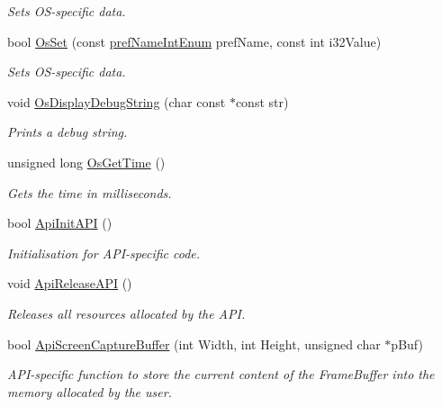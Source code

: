 \begin{DoxyCompactItemize}
\begin{DoxyCompactList}\small\item\em Sets O\+S-\/specific data. \end{DoxyCompactList}\item 
bool \hyperlink{class_p_v_r_shell_init_a106e2a1a5f4e45e93d982eea7466d322}{Os\+Set} (const \hyperlink{_p_v_r_shell_8h_a78ec4653192043575302f1448ae7054e}{pref\+Name\+Int\+Enum} pref\+Name, const int i32\+Value)
\begin{DoxyCompactList}\small\item\em Sets O\+S-\/specific data. \end{DoxyCompactList}\item 
void \hyperlink{class_p_v_r_shell_init_a282b715e1974b501cb178c140c546387}{Os\+Display\+Debug\+String} (char const $\ast$const str)
\begin{DoxyCompactList}\small\item\em Prints a debug string. \end{DoxyCompactList}\item 
unsigned long \hyperlink{class_p_v_r_shell_init_a4ee93258ea32e0656c002d2f788c94e8}{Os\+Get\+Time} ()
\begin{DoxyCompactList}\small\item\em Gets the time in milliseconds. \end{DoxyCompactList}\item 
bool \hyperlink{class_p_v_r_shell_init_af7302a4e9bdedf42303b351c2cc45f63}{Api\+Init\+A\+P\+I} ()
\begin{DoxyCompactList}\small\item\em Initialisation for A\+P\+I-\/specific code. \end{DoxyCompactList}\item 
void \hyperlink{class_p_v_r_shell_init_ac2854c9f2bc4ed75cc8b64c6ed64381b}{Api\+Release\+A\+P\+I} ()
\begin{DoxyCompactList}\small\item\em Releases all resources allocated by the A\+P\+I. \end{DoxyCompactList}\item 
bool \hyperlink{class_p_v_r_shell_init_a39a0e0003716ecb0d53401ba79a775ff}{Api\+Screen\+Capture\+Buffer} (int Width, int Height, unsigned char $\ast$p\+Buf)
\begin{DoxyCompactList}\small\item\em A\+P\+I-\/specific function to store the current content of the Frame\+Buffer into the memory allocated by the user. \end{DoxyCompactList}\item 

\end{DoxyCompactItemize}
